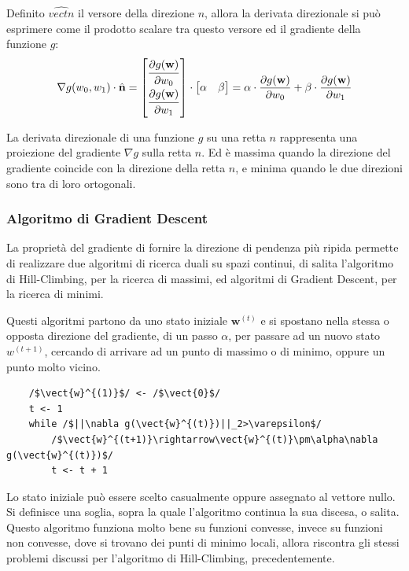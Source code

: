 \documentclass{article}
\numberwithin{equation}{subsection}
\newcommand{\vect}[1]{\boldsymbol{\mathbf{#1}}}
\begin{document}
Definito $\hat{vect{n}}$ il versore della direzione $n$, allora la derivata direzionale 
si può esprimere come il prodotto scalare tra questo versore ed il gradiente della funzione $g$:
\begin{gather*}
    \nabla g(w_0,w_1)\cdot\hat{\vect{n}}=
    \begin{bmatrix}
        \displaystyle\frac{\strut\partial g(\vect{w})}{\strut\partial w_0}\\        \displaystyle\frac{\strut\partial g(\vect{w})}{\strut\partial w_1}
    \end{bmatrix}\cdot\begin{bmatrix}
        \alpha&\beta
    \end{bmatrix}=\alpha\cdot\frac{\partial g(\vect{w})}{\partial w_0}+\beta\cdot\frac{\partial g(\vect{w})}{\partial w_1}
\end{gather*}

La derivata direzionale di una funzione $g$ su una retta $n$ rappresenta una proiezione del gradiente $\nabla g$ sulla retta $n$. Ed è massima quando la direzione del gradiente coincide con la direzione della retta $n$, e minima quando le due direzioni sono tra di loro 
ortogonali. 

\subsubsection{Algoritmo di Gradient Descent}

La proprietà del gradiente di fornire la direzione di pendenza più ripida permette di 
realizzare due algoritmi di ricerca duali su spazi continui, di salita l'algoritmo di 
Hill-Climbing, per la ricerca di massimi, ed algoritmi di Gradient Descent, per la ricerca 
di minimi. 

Questi algoritmi partono da uno stato iniziale $\vect{w}^{(t)}$ e si spostano nella stessa o opposta direzione del gradiente, di un passo $\alpha$, per passare ad un nuovo 
stato $w^{(t+1)}$, cercando di arrivare ad un punto di massimo o di minimo, oppure un punto 
molto vicino. 

\begin{verbatim}
    /$\vect{w}^{(1)}$/ <- /$\vect{0}$/
    t <- 1
    while /$||\nabla g(\vect{w}^{(t)})||_2>\varepsilon$/
        /$\vect{w}^{(t+1)}\rightarrow\vect{w}^{(t)}\pm\alpha\nabla g(\vect{w}^{(t)})$/
        t <- t + 1
\end{verbatim}

Lo stato iniziale può essere scelto casualmente oppure assegnato al vettore nullo. 
Si definisce una soglia, sopra la quale l'algoritmo continua la sua discesa, o salita. Questo 
algoritmo funziona molto bene su funzioni convesse, invece su funzioni non convesse, dove 
si trovano dei punti di minimo locali, allora riscontra gli stessi problemi discussi per l'algoritmo di Hill-Climbing, precedentemente. 
\end{document}
